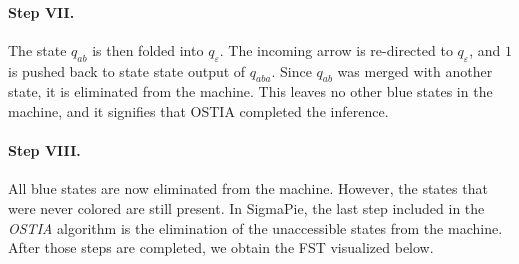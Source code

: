 \paragraph{Step VII.}

The state $q_{ab}$ is then folded into $q_{\varepsilon}$.
The incoming arrow is re-directed to $q_{\varepsilon}$, and $1$ is pushed back to state state output of $q_{aba}$.
Since $q_{ab}$ was merged with another state, it is eliminated from the machine.
This leaves no other blue states in the machine, and it signifies that OSTIA completed the inference.

\begin{center}
\end{center}

\paragraph{Step VIII.}

All blue states are now eliminated from the machine.
However, the states that were never colored are still present.
In SigmaPie, the last step included in the \emph{OSTIA} algorithm is the elimination of the unaccessible states from the machine.
After those steps are completed, we obtain the FST visualized below.%

\begin{center}
\end{center}


